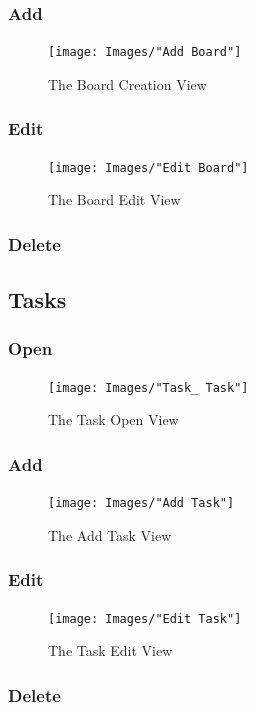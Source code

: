 \documentclass[letterpaper]{article}
\begin{document}
\subsubsection{Add}
\begin{figure}[H]
  \centering
  \caption{The Board Creation View}
  \texttt{[image: Images/"Add Board"]}
\end{figure}
\subsubsection{Edit}
\begin{figure}[H]
  \centering
  \caption{The Board Edit View}
  \texttt{[image: Images/"Edit Board"]}
\end{figure}
\subsubsection{Delete}

\subsection{Tasks}

\subsubsection{Open}
\begin{figure}[H]
  \centering
  \caption{The Task Open View}
  \texttt{[image: Images/"Task\_ Task"]}
\end{figure}
\subsubsection{Add}

\begin{figure}[H]
  \centering
  \caption{The Add Task View}
  \texttt{[image: Images/"Add Task"]}
\end{figure}
\subsubsection{Edit}

\begin{figure}[H]
  \centering
  \caption{The Task Edit View}
  \texttt{[image: Images/"Edit Task"]}
\end{figure}
\subsubsection{Delete}
\end{document}
